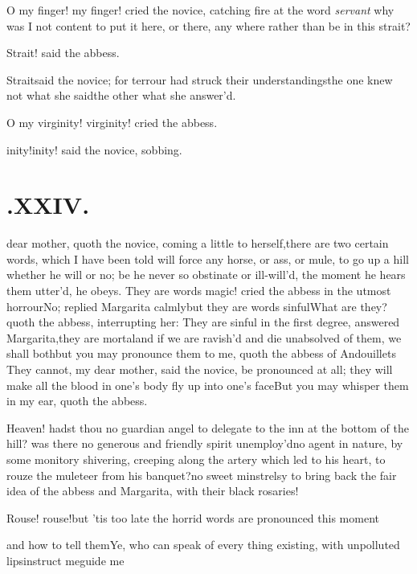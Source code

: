 \documentclass{article}
\begin{document}
O my finger! my finger! cried the novice, catching fire at the
word \textit{servant}
\tsk why was I not content to put it here, or
there, any where rather than be in this strait?

\tsh Strait! said the abbess.

Strait\tsh said the novice; for terrour had struck their
understandings\tsh the one knew not what she
said\tsh the other what she answer’d.

O my virginity! virginity! cried the abbess.

\tsh inity!\tsh inity! said the novice,
sobbing.

\vfill{}\eject
\null\smallskip

\section{.\enspace XXIV.}

 dear mother, quoth the novice,
coming a little to herself,\tsh there are two certain words,
which I have been told will force any horse, or ass, or mule, to go
up a hill whether he will or no; be he never so obstinate or
ill-will’d, the moment he hears them utter’d, he obeys.
They are words magic! cried the abbess in the utmost
horrour\tsk No; replied Margarita calmly\tsk but they are
words sinful\tsk What are they? quoth the abbess, interrupting
her: They are sinful in the first degree, answered
Margarita,\break\tsk they are mortal\tsk and if we are
ravish’d and die unabsolved of them, we shall
both\tsh but you may pronounce them to me, quoth the
abbess of Andouillets\sic\break
\tsh They cannot, my dear
mother, said the novice, be pronounced at all; they will make all
the blood in one’s body fly up into one’s
face\tsk But you may whisper them in my ear, quoth the
abbess.

Heaven! hadst thou no guardian angel to delegate to the inn at
the bottom of the hill? was there no generous and friendly spirit
unemploy’d\tsh no agent in nature, by some monitory
shivering, creeping along the artery which led to his heart, to
rouze the muleteer from his banquet?\tsh no sweet
minstrelsy to bring back the fair idea of the abbess and
Margarita, with their black rosaries!

Rouse! rouse!\tsh but ’tis too late\tsk\break
the horrid words are pronounced this moment\tsh{}

\tsh and how to tell them\tsk Ye, who can speak of
every thing existing, with unpolluted lips\tsk instruct
me\tsh guide me\tsh
\end{document}
